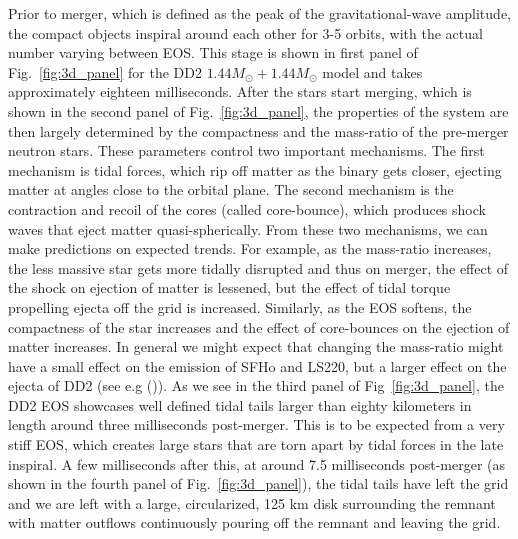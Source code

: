 Prior to merger, which is defined as the peak of the gravitational-wave amplitude, the compact objects inspiral
around each other for 3-5 orbits, with the actual number varying between EOS. This stage is shown in first panel of Fig.~\ref{fig:3d_panel} for the DD2 $1.44M_\odot + 1.44M_\odot$ model and takes approximately eighteen milliseconds. After the stars start merging, which is shown in the second panel of Fig.~\ref{fig:3d_panel}, the properties of the system are then largely determined by the compactness and the mass-ratio of the pre-merger neutron stars. These parameters control two important mechanisms. The first mechanism is tidal forces, which rip off matter as the binary gets closer, ejecting matter at angles close to the orbital plane. The second mechanism is the contraction and recoil of the cores (called core-bounce), which produces shock waves that eject matter quasi-spherically.  From these two mechanisms, we can make predictions on expected trends. For example, as the mass-ratio increases, the less massive star gets more tidally disrupted and thus on merger, the effect of the shock on ejection of matter is lessened, but the effect of tidal torque propelling ejecta off the grid is increased. Similarly, as the EOS softens, the compactness of the star increases and the effect of core-bounces on the ejection of matter increases. In general we might expect that changing the mass-ratio might have a small effect on the emission of SFHo and LS220, but a larger effect on the ejecta of DD2 (see e.g (\citet*{sekiguchi2016dynamical})). As we see in the third panel of Fig~\ref{fig:3d_panel}, the DD2 EOS showcases well defined tidal tails larger than eighty kilometers in length around three milliseconds post-merger. This is to be expected from a very stiff EOS, which creates large stars that are torn apart by tidal forces in the late inspiral. A few milliseconds after this, at around 7.5 milliseconds post-merger (as shown in the fourth panel of Fig.~\ref{fig:3d_panel}), the tidal tails have left the grid and we are left with a large, circularized, 125 km disk surrounding the remnant with matter outflows continuously pouring off the remnant and leaving the grid. 



